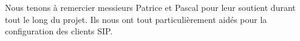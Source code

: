
Nous tenons à remercier messieurs Patrice  et Pascal  pour leur soutient durant tout le long du projet. Ils nous ont tout particulièrement aidés pour la configuration des clients SIP.